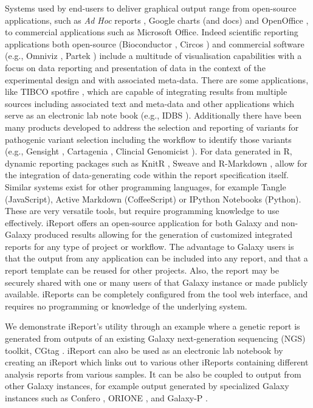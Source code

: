 Systems used by end-users to deliver graphical output range from open-source applications, such as \emph{Ad Hoc} reports \cite{url-adhoc}, Google charts (and docs) \cite{url-googlecharts} and OpenOffice \cite{url-openoffice}, to commercial applications such as Microsoft Office. Indeed scientific reporting applications both open-source (Bioconductor \cite{url-bioconductor}, Circos \cite{circos}\cite{url-circos}) and commercial software (e.g., Omniviz \cite{url-omniviz}, Partek \cite{url-partek}) include a multitude of visualisation capabilities with a focus on data reporting and presentation of data in the context of the experimental design and with associated meta-data. There are some applications, like TIBCO spotfire \cite{url-spotfire}, which are capable of integrating results from multiple sources including associated text and meta-data and other applications which serve as an electronic lab note book (e.g., IDBS \cite{url-idbs}).  Additionally there have been many products developed to address the selection and reporting of variants for pathogenic variant selection including the workflow to identify those variants (e.g., Gensight \cite{url-gensight}, Cartagenia \cite{url-cartagenia}, Clincial Genomicist \cite{clinicalgenomist}). For data generated in R, dynamic reporting packages such as KnitR \cite{url-knitr}, Sweave \cite{sweave} and R-Markdown \cite{url-rmarkdown}, allow for the integration of data-generating code within the report specification itself. Similar systems exist for other programming languages, for example Tangle \cite{url-tangle} (JavaScript), Active Markdown \cite{url-activemarkdown}(CoffeeScript) or IPython Notebooks \cite{url-ipythonnotebook} (Python). These are very versatile tools, but require programming knowledge to use effectively. iReport offers an open-source application for both Galaxy and non-Galaxy produced results allowing for the generation of customized integrated reports for any type of project or workflow. The advantage to Galaxy users is that the output from any application can be included into any report, and that a report template can be reused for other projects. Also, the report may be securely shared with one or many users of that Galaxy instance or made publicly available. iReports can be completely configured from the tool web interface, and requires no programming or knowledge of the underlying system.

We demonstrate iReport’s utility through an example where a genetic report is generated from outputs of an existing Galaxy next-generation sequencing (NGS) toolkit, CGtag \cite{cgtag}. iReport can also be used as an electronic lab notebook by creating an iReport which links out to various other iReports containing different analysis reports from various samples. It can be also be coupled to output from other Galaxy instances, for example output generated by specialized Galaxy instances such as Confero \cite{confero}, ORIONE \cite{orione}, and Galaxy-P \cite{url-galaxyp}.

